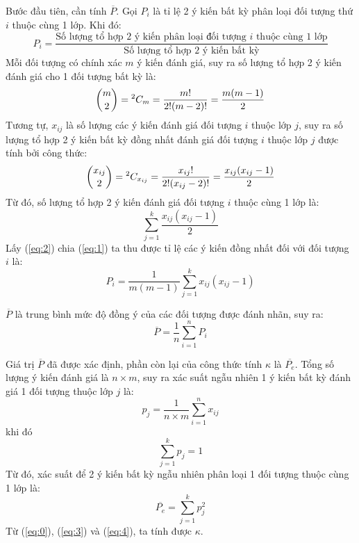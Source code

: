 Bước đầu tiên, cần tính $\overline{P}$. Gọi $P_i$ là tỉ lệ 2 ý kiến bất kỳ phân loại đối tượng thứ $i$ thuộc cùng 1 lớp. Khi đó:
$$P_i = \dfrac{\text{Số lượng tổ hợp 2 ý kiến phân loại đối tượng } i \text{ thuộc cùng 1 lớp}}{\text{Số lượng tổ hợp 2 ý kiến bất kỳ}}$$
Mỗi đối tượng có chính xác $m$ ý kiến đánh giá, suy ra số lượng tổ hợp 2 ý kiến đánh giá cho 1 đối tượng bất kỳ là:
\begin{equation}\label{eq:1}
\binom m2={}^{2}C_{m}=\frac{m!}{2!(m-2)!} = \dfrac{m(m-1)}{2}
\end{equation}
Tương tự, $x_{ij}$ là số lượng các ý kiến đánh giá đối tượng $i$ thuộc lớp $j$, suy ra số lượng tổ hợp 2 ý kiến bất kỳ đồng nhất đánh giá đối tượng $i$ thuộc lớp $j$ được tính bởi công thức:
$$\binom {x_{ij}}2={}^{2}C_{x_{ij}}=\frac{x_{ij}!}{2!(x_{ij}-2)!} = \dfrac{x_{ij}(x_{ij}-1)}{2}$$
Từ đó, số lượng tổ hợp 2 ý kiến đánh giá đối tượng $i$ thuộc cùng 1 lớp là:
\begin{equation}\label{eq:2}
\sum_{j=1}^{k}\dfrac{x_{ij}(x_{ij}-1)}{2}
\end{equation}
Lấy (\ref{eq:2}) chia (\ref{eq:1}) ta thu được tỉ lệ các ý kiến đồng nhất đối với đối tượng $i$ là:
$$P_i = \dfrac{1}{m(m-1)}\sum_{j=1}^{k}x_{ij}(x_{ij}-1)$$

$\overline{P}$ là trung bình mức độ đồng ý của các đối tượng được đánh nhãn, suy ra:
\begin{equation} \label{eq:3}
\overline{P} = \dfrac{1}{n}\sum_{i=1}^{n}P_i
\end{equation}

Giá trị $\overline{P}$ đã được xác định, phần còn lại của công thức tính $\kappa$ là $\overline{P_e}$. Tổng số lượng ý kiến đánh giá là $n \times m$, suy ra xác suất ngẫu nhiên 1 ý kiến bất kỳ đánh giá 1 đối tượng thuộc lớp $j$ là:
$$p_j = \dfrac{1}{n \times m} \sum_{i=1}^{n} x_{ij}$$ khi đó $$\sum_{j=1}^{k} p_j=1$$
Từ đó, xác suất để 2 ý kiến bất kỳ ngẫu nhiên phân loại 1 đối tượng thuộc cùng 1 lớp là:
\begin{equation}\label{eq:4}
\overline{P_e} = \sum_{j=1}^{k}p_j^{2}
\end{equation}
Từ (\ref{eq:0}), (\ref{eq:3}) và (\ref{eq:4}), ta tính được $\kappa$.\\

